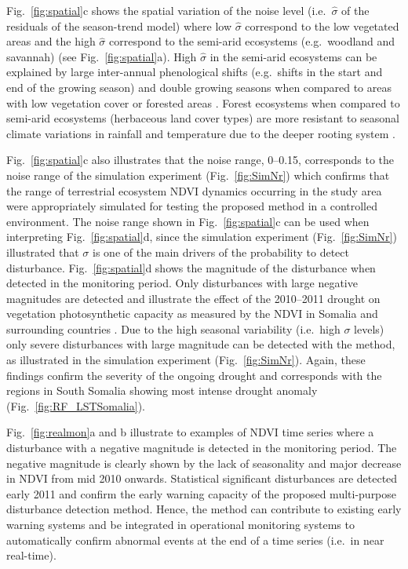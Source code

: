 \documentclass[authoryear,preprint,review,10pt]{elsarticle}
\begin{document}
Fig.~\ref{fig:spatial}c shows the spatial variation of the noise level (i.e.\ $\hat \sigma$ of the residuals of the season-trend model) where low $\hat
\sigma$ correspond to the low vegetated areas and the high $\hat \sigma$ correspond to the semi-arid ecosystems (e.g.\ woodland and savannah) (see
Fig.~\ref{fig:spatial}a). High $\hat \sigma$  in the semi-arid ecosystems can be explained by large inter-annual phenological shifts (e.g.\ shifts in the
start and end of the growing season) and double growing seasons when compared to areas with low vegetation cover or forested areas \citep{Verbesselt:2010wo,
Brown:2010fq}. Forest ecosystems when compared to semi-arid ecosystems (herbaceous land cover types) are more resistant to seasonal climate variations in
rainfall and temperature due to the deeper rooting system \citep{Verbesselt2006}. 

Fig.~\ref{fig:spatial}c also illustrates that the noise range, 0--0.15, corresponds to the noise range of the simulation experiment (Fig.~\ref{fig:SimNr}) which confirms that the range of terrestrial ecosystem NDVI dynamics occurring in the study area were appropriately simulated for testing the proposed method in a controlled environment. 
The noise range shown in Fig.~\ref{fig:spatial}c can be used when interpreting Fig.~\ref{fig:spatial}d, since the simulation experiment 
(Fig.~\ref{fig:SimNr}) illustrated that $\sigma$ is one of the main drivers of the probability to detect disturbance. Fig.~\ref{fig:spatial}d shows the
magnitude of the disturbance when detected in the monitoring period. Only disturbances with large negative magnitudes are detected and illustrate the effect
of the 2010--2011 drought on vegetation photosynthetic capacity as measured by the NDVI in Somalia and surrounding countries \citep{Funk:2011fg}. Due to the
high seasonal variability (i.e.\ high $\sigma$ levels) only severe disturbances with large magnitude can be detected with the method, as illustrated in the simulation experiment (Fig.~\ref{fig:SimNr}). Again, these findings confirm the severity of the ongoing drought and corresponds with the regions in South Somalia showing most intense drought anomaly (Fig.~\ref{fig:RF_LSTSomalia}).

Fig.~\ref{fig:realmon}a and b illustrate to examples of NDVI time series where a disturbance with a negative magnitude is detected in the monitoring period. The negative magnitude is clearly shown by the lack of seasonality and major decrease in NDVI from mid 2010 onwards. Statistical significant disturbances are detected early 2011 and confirm the early warning capacity of the proposed multi-purpose disturbance detection method. Hence, the method can contribute to existing early warning systems and be integrated in operational monitoring systems to automatically confirm abnormal events at the end of a time series (i.e.\ in near real-time). 
\end{document}
